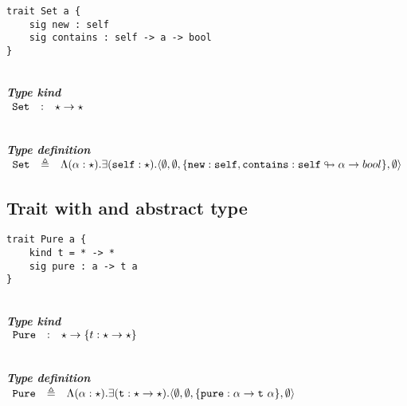 \documentclass{article}[11pt]
\newcommand{\subsubsubsection}[1]
{
    ~\\
    {\bf {\em #1}} \\
}
\newcommand{\term}[1]{\verb~#1~}
\begin{document}
    \begin{verbatim}
trait Set a {
    sig new : self
    sig contains : self -> a -> bool
}
    \end{verbatim}

    \subsubsubsection{Type kind}

    \noindent
    \begin{math}
        \begin{array}{rclp{5cm}}
            \term{Set}  & : & \star \rightarrow \star
        \end{array}
    \end{math}

    \subsubsubsection{Type definition}

    \noindent
    \begin{math}
        \begin{array}{rclp{5cm}}
            \term{Set} & \triangleq & \Lambda(\alpha:\star).\exists(\term{self}:\star).\langle
            \emptyset,
            \emptyset,
            \{ \term{new} : \term{self}, \term{contains} : \term{self} \looparrowright \alpha \rightarrow bool \},
            \emptyset
            \rangle
        \end{array}
    \end{math}

    \subsection{Trait with and abstract type}\label{subsec:trait-with-and-abstract-type}

    \begin{verbatim}
trait Pure a {
    kind t = * -> *
    sig pure : a -> t a
}
    \end{verbatim}

    \subsubsubsection{Type kind}

    \noindent
    \begin{math}
        \begin{array}{rclp{5cm}}
            \term{Pure} & : & \star \rightarrow \{ t : \star \rightarrow \star \}
        \end{array}
    \end{math}

    \subsubsubsection{Type definition}

    \noindent
    \begin{math}
        \begin{array}{rclp{5cm}}
            \term{Pure} & \triangleq & \Lambda(\alpha:\star).\exists(\term{t}:\star \rightarrow \star).\langle
            \emptyset,
            \emptyset,
            \{ \term{pure} : \alpha \rightarrow \term{t}~\alpha \},
            \emptyset
            \rangle
        \end{array}
    \end{math}
\end{document}
